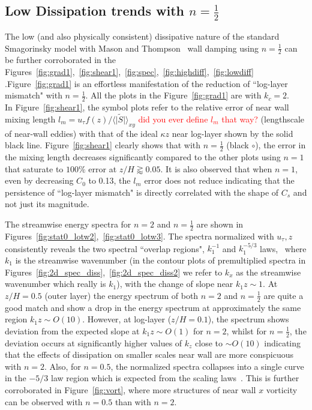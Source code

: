 \subsection{Low Dissipation trends with $n = \frac{1}{2}$}
The low (and also physically consistent) dissipative nature of the standard Smagorinsky model with Mason and Thompson~\cite{mason} wall damping using $n = \frac{1}{2}$ can be further corroborated in the Figures~\ref{fig:grad1},~\ref{fig:shear1},~\ref{fig:spec},~\ref{fig:highdiff},~\ref{fig:lowdiff}
.{Figure~\ref{fig:grad1} is an effortless manifestation of the reduction of ``log-layer mismatch" with $n = \frac{1}{2}$. All the plots in the Figure~\ref{fig:grad1} are with $k_c = 2$.}  \\
In Figure~\ref{fig:shear1}, the symbol plots refer to the relative error of near wall mixing length $l_m = {u_{\tau}}{f(z)/\langle\vert \widetilde{S} \vert\rangle_{xy}}$ \textcolor{red}{did you ever define $l_m$ that way?} (lengthscale of near-wall eddies) with that of the ideal $\kappa z$ near log-layer shown by the solid black line. Figure~\ref{fig:shear1} clearly shows that with $n = \frac{1}{2}$ (black $\circ$), the error in the mixing length decreases significantly compared to the other plots using $n = 1$ {that} saturate to $100\%$ error at $z/H \gtrapprox 0.05$. It is also observed that when $n = 1$, even by decreasing {$C_0$} to 0.13, the $l_m$ error does not reduce indicating {that} the persistence of ``log-layer mismatch" is directly correlated with the shape of $C_s$ and not just its magnitude.

The streamwise energy spectra for $n = 2$ and $n = \frac{1}{2}$ are shown in Figures~\ref{fig:stat0_lotw2},~\ref{fig:stat0_lotw3}. The spectra normalized with $u_{\tau}, z$ consistently reveals the two spectral ``overlap regions", $k_1^{-1}$ and $k_1^{-{5}/{3}}$ laws,~\cite{perry,porte1fun,meyers2} where $k_1$ is the streamwise wavenumber (in the contour plots of premultiplied spectra in Figures~\ref{fig:2d_spec_diss},~\ref{fig:2d_spec_diss2} we refer to $k_x$ as the streamwise wavenumber which really is $k_1$), with the change of slope near $k_1 z \sim 1 $. At $z/H = 0.5$ (outer layer) the energy spectrum of both $n = 2$ and $n = \frac{1}{2}$ are quite a good match and show a drop in the energy spectrum at approximately the same region $k_1 z \sim O(10)$.  However, at log-layer ($z/H = 0.1$), the spectrum shows {deviation from the expected slope} at {$k_1 z \sim O(1)$} for $n = 2$, whilst for $n = \frac{1}{2}$, the {deviation} occurs at {significantly higher values of $k_z$ close to $\sim O(10)$} indicating that the effects of dissipation on smaller scales near wall are more conspicuous with $n = 2$. Also, for $n = 0.5$, the normalized spectra collapses into a single curve in the $-5/3$ law region which is expected from the scaling laws~\cite{perry}. This is further corroborated in Figure~\ref{fig:vort}, where more structures of near wall $x$ vorticity can be observed with $n = 0.5$ than with $n = 2$.

